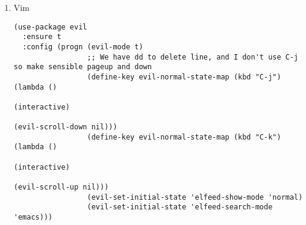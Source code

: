 \documentclass[11pt]{article}
\begin{document}
\begin{enumerate}
\begin{verbatim}
(use-package smart-tabs-mode
  ;; use tabs for indentation, spaces for alignment.
  :disabled t
  :init (setq-default indent-tabs-mode nil)
  :config (progn
            (add-hook 'prog-mode-hook (lambda () (setq indent-tabs-mode t)))
            (smart-tabs-insinuate 'javascript)))

(use-package ivy
  :ensure t
  :config (progn (ivy-mode 1)
                 (use-package counsel
                   :ensure t)
                 (global-set-key (kbd "M-x") 'counsel-M-x)
                 (global-set-key (kbd "C-x C-f") 'counsel-find-file)))

(use-package whitespace
  :init (setq whitespace-display-mappings
              '((newline-mark ?\n    [?¬ ?\n] [?$ ?\n])
                (space-mark   ?\     [?·]     [?.])
                (space-mark   ?\xA0  [?¤]     [?_]))
              whitespace-style '(face trailing tabs spaces newline
                                      indentation::tab indentation::space indentation
                                      space-mark tab-mark newline-mark))
  :config (global-whitespace-mode t))

(use-package org-ref
  :init (setq org-ref-default-citation-link "autocite"))

(use-package elfeed)
(use-package elfeed-goodies
  :config (elfeed-goodies/setup))
(use-package elfeed-org
  :config (elfeed-org)
  (setq rmh-elfeed-org-files (list "~/org/elfeed.org")))
\end{verbatim}

\item Vim
\label{sec-1-2-2-5}

\begin{verbatim}
(use-package evil
  :ensure t
  :config (progn (evil-mode t)
                 ;; We have dd to delete line, and I don't use C-j so make sensible pageup and down
                 (define-key evil-normal-state-map (kbd "C-j") (lambda ()
                                                                 (interactive)
                                                                 (evil-scroll-down nil)))
                 (define-key evil-normal-state-map (kbd "C-k") (lambda ()
                                                                 (interactive)
                                                                 (evil-scroll-up nil)))
                 (evil-set-initial-state 'elfeed-show-mode 'normal)
                 (evil-set-initial-state 'elfeed-search-mode 'emacs)))


\end{verbatim}
\end{enumerate}
\end{document}
